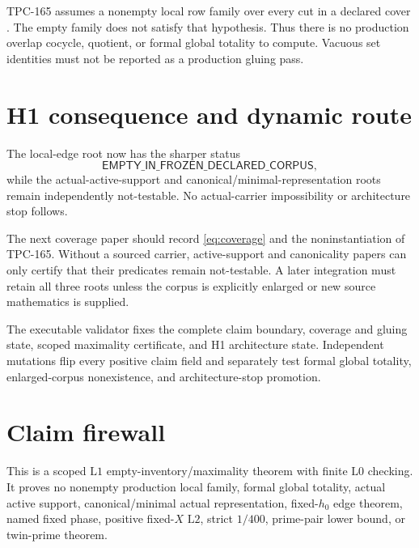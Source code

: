 \documentclass[11pt]{article}
\newcommand{\Lzero}{\mathrm{L0}}
\newcommand{\Lone}{\mathrm{L1}}
\newcommand{\Ltwo}{\mathrm{L2}}
\begin{document}
TPC-165 assumes a nonempty local row family over every cut in a declared
cover \citep{WangTPC165}.  The empty family does not satisfy that hypothesis.
Thus there is no production overlap cocycle, quotient, or formal global
totality to compute.  Vacuous set identities must not be reported as a
production gluing pass.

\section{H1 consequence and dynamic route}

The local-edge root now has the sharper status
\[
 \mathsf{EMPTY\_IN\_FROZEN\_DECLARED\_CORPUS},
\]
while the actual-active-support and canonical/minimal-representation roots
remain independently not-testable.  No actual-carrier impossibility or
architecture stop follows.

The next coverage paper should record \eqref{eq:coverage} and the
noninstantiation of TPC-165.  Without a sourced carrier, active-support and
canonicality papers can only certify that their predicates remain
not-testable.  A later integration must retain all three roots unless the
corpus is explicitly enlarged or new source mathematics is supplied.

The executable validator fixes the complete claim boundary, coverage and
gluing state, scoped maximality certificate, and H1 architecture state.
Independent mutations flip every positive claim field and separately test
formal global totality, enlarged-corpus nonexistence, and architecture-stop
promotion.

\section{Claim firewall}

This is a scoped \(\Lone\) empty-inventory/maximality theorem with finite
\(\Lzero\) checking.  It proves no nonempty production local family, formal
global totality, actual active support, canonical/minimal actual
representation, fixed-\(h_0\) edge theorem, named fixed phase, positive
fixed-\(X\) \(\Ltwo\), strict \(1/400\), prime-pair lower bound, or twin-prime
theorem.



\end{document}
